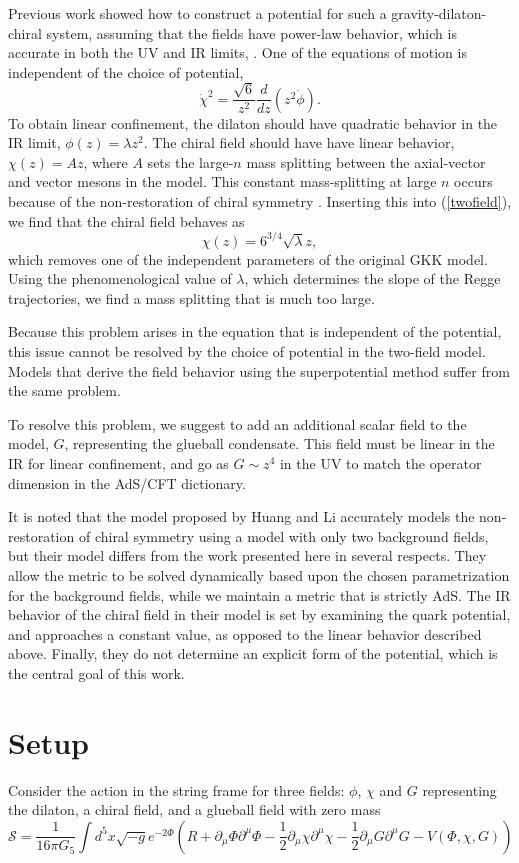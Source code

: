 \documentclass[12pt]{article}
\newcommand{\be}{\begin{equation}}
\newcommand{\ee}{\end{equation}}
\def\thalf{{\textstyle{\frac{1}{2}}}}
\def\root{\sqrt{-g}}
\def\Dz{\frac{d}{dz}}
\def\phidot{\dot{\phi}}
\def\chidot{\dot{\chi}}
\def\rt6{\sqrt{6}}
\newcommand{\cS}{\mathcal S}
\begin{document}
Previous work showed how to construct a potential for such a gravity-dilaton-chiral system, assuming that the fields have power-law behavior, which is accurate in both the UV and IR limits, \cite{Springer 2010}. 
One of the equations of motion is independent of the choice of potential,
\be
\chidot^2  = \frac{\rt6}{z^2} \Dz(z^2\phidot). 
\label{twofield}
\ee
To obtain linear confinement, the dilaton should have quadratic behavior in the IR limit, $\phi(z)=\lambda z^2$.
The chiral field should have have linear behavior, $\chi(z)=A z$, where $A$ sets the large-$n$ mass splitting between the axial-vector and vector mesons in the model. 
This constant mass-splitting at large $n$ occurs because of the non-restoration of chiral symmetry \cite{Shifman-2008}.
Inserting this into (\ref{twofield}), we find that the chiral field behaves as
\be
\chi(z)=6^{3/4}\sqrt{\lambda}z,
\ee
which removes one of the independent parameters of the original GKK model. 
Using the phenomenological value of $\lambda$, which determines the slope of the Regge trajectories, we find a mass splitting that is much too large.

Because this problem arises in the equation that is independent of the potential, this issue cannot be resolved by the choice of potential in the two-field model. 
Models that derive the field behavior using the superpotential method suffer from the same problem.

To resolve this problem, we suggest to add an additional scalar field to the model, $G$, representing the glueball condensate. 
This field must be linear in the IR for linear confinement, and go as $G \sim z^4$ in the UV to match the operator dimension in the AdS/CFT dictionary.

It is noted that the model proposed by Huang and Li \cite{Li2013, Li2013a} accurately models the non-restoration of chiral symmetry using a model with only two background fields, but their model differs from the work presented here in several respects.
They allow the metric to be solved dynamically based upon the chosen parametrization for the background fields, while we maintain a metric that is strictly AdS.
The IR behavior of the chiral field in their model is set by examining the quark potential, and approaches a constant value, as opposed to the linear behavior described above.
Finally, they do not determine an explicit form of the potential, which is the central goal of this work.


\section{Setup}
Consider the action in the string frame for three fields: $\phi$, $\chi$ and $G$ representing the dilaton, a chiral field, and a glueball field with zero mass
\be
\cS=\frac{1}{16\pi G_5} \int d^5x \root e^{-2\Phi} \left(R+\partial_\mu\Phi\partial^\mu\Phi - \thalf\partial_\mu\chi\partial^\mu\chi - \thalf\partial_\mu G \partial^\mu G -V(\Phi,\chi,G)\right)
\ee
\end{document}
